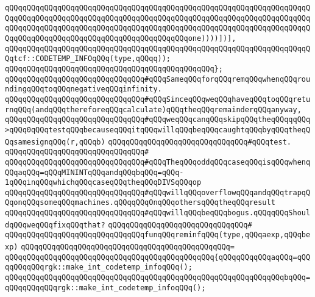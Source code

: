 \verb|qQQqqQQqqQQqqQQqqQQqqQQqqQQqqQQqqQQqqQQqqQQqqQQqqQQqqQQqqQQqqQQqqQQqqQQqqQQqqQQqqQQqqQQqqQQqqQQqqQQqqQQqqQQqqQQqqQQqqQQqqQQqqQQqqQQqqQQqqQQqqQQqqQQqqQQqqQQqqQQqqQQqqQQqqQQqqQQqqQQqqQQqqQQqqQQqqQQqqQQqqQQqqQQqqQQqqQQqqQQqqQQqqQQqqQQqqQQqqQQqqQQqqQQqqQQqone))))])],|\newline
\verb|qQQqqQQqqQQqqQQqqQQqqQQqqQQqqQQqqQQqqQQqqQQqqQQqqQQqqQQqqQQqqQQqqQQqqQQqtcf::CODETEMP_INFOqQQq(type,qQQqq));|\newline
\verb|qQQqqQQqqQQqqQQqqQQqqQQqqQQqqQQqqQQqqQQqqQQqqQQq};|\newline
\newline
\verb|qQQqqQQqqQQqqQQqqQQqqQQqqQQqqQQq#qQQqSameqQQqforqQQqremqQQqwhenqQQqroundingqQQqtoqQQqnegativeqQQqinfinity.|\newline
\verb|qQQqqQQqqQQqqQQqqQQqqQQqqQQqqQQq#qQQqSinceqQQqweqQQqhaveqQQqtoqQQqreturnqQQq(andqQQqthereforeqQQqcalculate)qQQqtheqQQqremainderqQQqanyway,|\newline
\verb|qQQqqQQqqQQqqQQqqQQqqQQqqQQqqQQq#qQQqweqQQqcanqQQqskipqQQqtheqQQqqqQQq>qQQq0qQQqtestqQQqbecauseqQQqitqQQqwillqQQqbeqQQqcaughtqQQqbyqQQqtheqQQqsamesignqQQq(r,qQQqb)|\newline
\verb|qQQqqQQqqQQqqQQqqQQqqQQqqQQqqQQq#qQQqtest.|\newline
\verb|qQQqqQQqqQQqqQQqqQQqqQQqqQQqqQQq#|\newline
\verb|qQQqqQQqqQQqqQQqqQQqqQQqqQQqqQQq#qQQqTheqQQqoddqQQqcaseqQQqisqQQqwhenqQQqaqQQq=qQQqMININTqQQqandqQQqbqQQq=qQQq-1qQQqinqQQqwhichqQQqcaseqQQqtheqQQqDIVSqQQqop|\newline
\verb|qQQqqQQqqQQqqQQqqQQqqQQqqQQqqQQq#qQQqwillqQQqoverflowqQQqandqQQqtrapqQQqonqQQqsomeqQQqmachines.qQQqqQQqOnqQQqothersqQQqtheqQQqresult|\newline
\verb|qQQqqQQqqQQqqQQqqQQqqQQqqQQqqQQq#qQQqwillqQQqbeqQQqbogus.qQQqqQQqShouldqQQqweqQQqfixqQQqthat?|\newline
\verb|qQQqqQQqqQQqqQQqqQQqqQQqqQQqqQQq#|\newline
\verb|qQQqqQQqqQQqqQQqqQQqqQQqqQQqqQQqfunqQQqreminfqQQq(type,qQQqaexp,qQQqbexp)|\newline
\verb|qQQqqQQqqQQqqQQqqQQqqQQqqQQqqQQqqQQqqQQqqQQqqQQq=|\newline
\verb|qQQqqQQqqQQqqQQqqQQqqQQqqQQqqQQqqQQqqQQqqQQqqQQq{qQQqqQQqqQQqaqQQq=qQQqqQQqqQQqrgk::make_int_codetemp_infoqQQq();|\newline
\verb|qQQqqQQqqQQqqQQqqQQqqQQqqQQqqQQqqQQqqQQqqQQqqQQqqQQqqQQqqQQqqQQqbqQQq=qQQqqQQqqQQqrgk::make_int_codetemp_infoqQQq();|\newline
